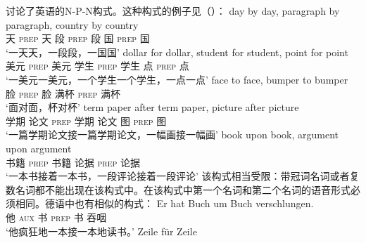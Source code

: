 \begin{exe}
\begin{xlist}[iv.]
\begin{exe}
\begin{xlist}[iv.]
\mbox{}\citet{Jackendoff2008a}讨论了英语的N-P-N构式。这种构式的例子见（）：
\eal
\ex 
\gll day by day, paragraph by paragraph, country by country\\
     天 \textsc{prep} 天 段 \textsc{prep} 段 国 \textsc{prep} 国\\
\glt `一天天，一段段，一国国'
\ex
\gll dollar for dollar, student for student, point for point\\
     美元 \textsc{prep} 美元 学生 \textsc{prep} 学生 点 \textsc{prep} 点\\
\glt `一美元一美元，一个学生一个学生，一点一点' 
\ex 
\gll face to face, bumper to bumper\\
     脸 \textsc{prep} 脸 满杯 \textsc{prep} 满杯\\
\glt `面对面，杯对杯'
\ex
\gll term paper after term paper, picture after picture\\
     学期 论文 \textsc{prep} 学期 论文 图 \textsc{prep} 图\\
\glt `一篇学期论文接一篇学期论文，一幅画接一幅画' 
\ex 
\gll book upon book, argument upon argument\\
     书籍 \textsc{prep} 书籍 论据 \textsc{prep} 论据\\
\glt `一本书接着一本书，一段评论接着一段评论'
\zl
该构式相当受限：带冠词名词或者复数名词都不能出现在该构式中。在该构式中第一个名词和第二个名词的语音形式必须相同。德语中也有相似的构式：
\eal
\ex 
\gll Er hat Buch um Buch verschlungen.\\
	 他 \textsc{aux} 书 \textsc{prep} 书 吞咽\\
\glt `他疯狂地一本接一本地读书。'
\ex 
\gll Zeile für Zeile\footnotemark\\

\end{xlist}
\end{exe}
\end{xlist}
\end{exe}
